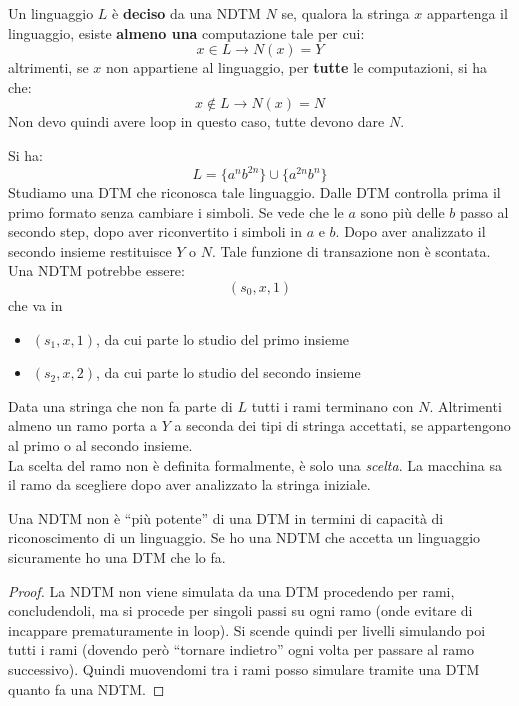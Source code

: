 \begin{definizione}
  Un linguaggio $L$ è \textbf{deciso} da una NDTM $N$ se, qualora la stringa $x$
  appartenga il linguaggio, esiste \textbf{almeno una} computazione tale per
  cui: 
  \[x\in L\rightarrow N(x)=Y\]
  altrimenti, se $x$ non appartiene al linguaggio, per \textbf{tutte} le
  computazioni, si ha che: 
  \[x\not\in L \rightarrow N(x)=N\]
  Non devo quindi avere loop in questo caso, tutte devono dare $N$.
\end{definizione}
\begin{esempio}
  Si ha:
  \[L=\{a^nb^{2n}\}\cup\{a^{2n}b^n\}\]
  Studiamo una DTM che riconosca tale linguaggio. Dalle DTM controlla prima il
  primo formato senza cambiare i simboli. Se vede che le $a$ sono più delle $b$
  passo al secondo step, dopo aver riconvertito i simboli in $a$ e $b$. Dopo
  aver analizzato il secondo insieme restituisce $Y$ o $N$. Tale funzione di
  transazione non è scontata.\\
  Una NDTM potrebbe essere:
  \[(s_0,x,1)\]
  che va in
  \begin{itemize}
    \item $(s_1,x,1)$, da cui parte lo studio del primo insieme
    \item $(s_2,x,2)$, da cui parte lo studio del secondo insieme
  \end{itemize}
  Data una stringa che non fa parte di $L$ tutti i rami terminano con
  $N$. Altrimenti almeno un ramo porta a $Y$ a seconda dei tipi di stringa
  accettati, se appartengono al primo o al secondo insieme. \\
  La scelta del ramo non è definita formalmente, è solo una \textit{scelta}. La
  macchina sa il ramo da scegliere dopo aver analizzato la stringa iniziale.
\end{esempio}
\begin{teorema}
  Una NDTM non è ``più potente'' di una DTM in termini di capacità di
  riconoscimento di un linguaggio. Se ho una NDTM che accetta un linguaggio
  sicuramente ho una DTM che lo fa.
\end{teorema}
\begin{proof}
  La NDTM non viene simulata da una DTM procedendo per rami, concludendoli, ma
  si procede per singoli passi su ogni ramo (onde evitare di incappare
  prematuramente in loop). Si scende quindi per livelli simulando poi tutti i
  rami (dovendo però ``tornare indietro'' ogni volta per passare al ramo
  successivo). Quindi muovendomi tra i rami posso simulare tramite una DTM
  quanto fa una NDTM.
\end{proof}
